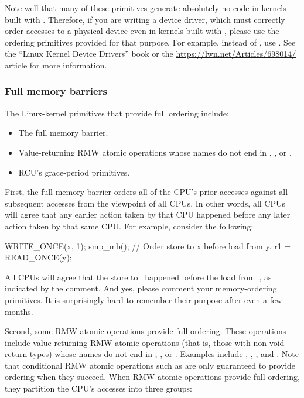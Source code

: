 Note well that many of these primitives generate absolutely no code
in kernels built with .
Therefore, if you are writing a device driver, which must correctly
order accesses to a physical device even in kernels built with
, please use the ordering primitives provided for
that purpose.
For example, instead of , use .
See the ``Linux Kernel Device Drivers'' book or the
\url{https://lwn.net/Articles/698014/} article for more information.


\subsubsection{Full memory barriers}

The Linux-kernel primitives that provide full ordering include:

\begin{itemize}
 \item	The  full memory barrier.

 \item	Value-returning RMW atomic operations whose names do not end in
	, , or .

 \item	RCU's grace-period primitives.
\end{itemize}

First, the  full memory barrier orders all of the CPU's prior
accesses against all subsequent accesses from the viewpoint of all CPUs.
In other words, all CPUs will agree that any earlier action taken
by that CPU happened before any later action taken by that same CPU\@.
For example, consider the following:

\begin{VerbatimU}
	WRITE_ONCE(x, 1);
	smp_mb(); // Order store to x before load from y.
	r1 = READ_ONCE(y);
\end{VerbatimU}

All CPUs will agree that the store to~ happened before the load
from~, as indicated by the comment.
And yes, please comment your memory-ordering primitives.
It is surprisingly hard to remember their purpose after even a few months.

Second, some RMW atomic operations provide full ordering.
These operations include value-returning RMW atomic operations
(that is, those with non-void return types) whose names do not end in
, , or .
Examples include , ,
, and .
Note that conditional RMW atomic operations such as  are
only guaranteed to provide ordering when they succeed.
When RMW atomic operations provide full ordering, they partition the
CPU's accesses into three groups:

